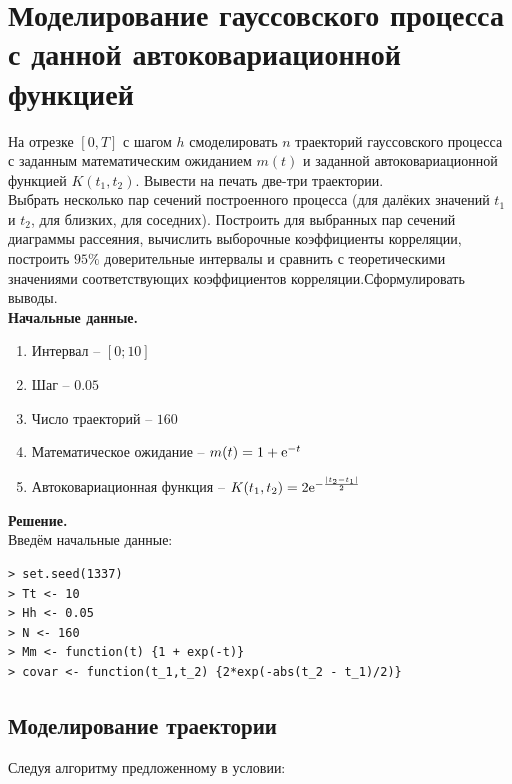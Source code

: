 \documentclass[14pt,a4paper]{scrartcl}
\begin{document}
\section*{Моделирование гауссовского процесса с данной автоковариационной функцией}
На отрезке $[0,T]$ с шагом $h$ смоделировать $n$ траекторий гауссовского процесса с заданным математическим ожиданием $m(t)$ и заданной автоковариационной функцией $K(t_1,t_2)$. Вывести на печать две-три траектории.\\
Выбрать несколько пар сечений построенного процесса (для далёких значений $t_1$ и $t_2$, для близких, для соседних). Построить для выбранных пар сечений диаграммы рассеяния, вычислить выборочные коэффициенты корреляции, построить $95\%$ доверительные интервалы и сравнить с теоретическими значениями соответствующих коэффициентов корреляции.Сформулировать выводы.\\
\textbf{Начальные данные.}\\
\begin{enumerate}
	\item Интервал -- $[0;10]$\\
	\item Шаг -- $0.05$\\
	\item Число траекторий -- $160$\\
	\item Математическое ожидание -- $m(t) = 1 + {\rm e}^{-t}$\\
	\item Автоковариационная функция -- $K(t_1,t_2) = 2{\rm e}^{-\frac{|t_2 - t_1|}{2}}$ 
\end{enumerate}

\textbf{Решение.}\\
Введём начальные данные:

\begin{verbatim}
> set.seed(1337)
> Tt <- 10
> Hh <- 0.05
> N <- 160
> Mm <- function(t) {1 + exp(-t)}
> covar <- function(t_1,t_2) {2*exp(-abs(t_2 - t_1)/2)}
\end{verbatim}

\pagebreak

\subsection*{Моделирование траектории}

Следуя алгоритму предложенному в условии:
\end{document}
